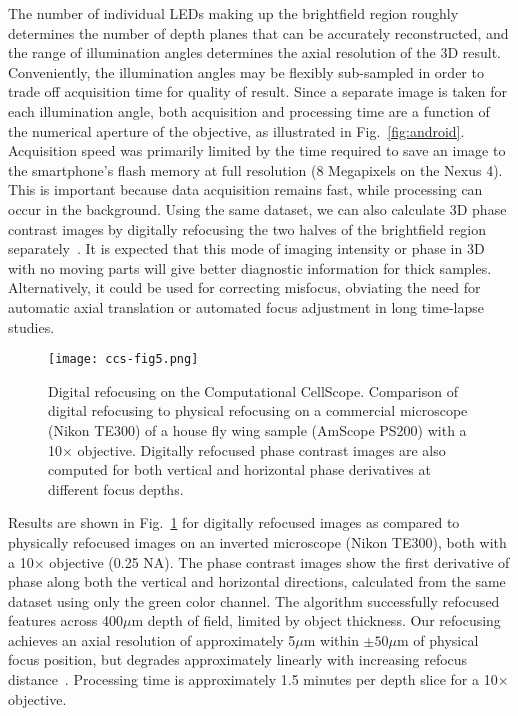 The number of individual LEDs making up the brightfield region roughly determines the number of depth planes that can be accurately reconstructed, and the range of illumination angles determines the axial resolution of the 3D result. Conveniently, the illumination angles may be flexibly sub-sampled in order to trade off acquisition time for quality of result. Since a separate image is taken for each illumination angle, both acquisition and processing time are a function of the numerical aperture of the objective, as illustrated in Fig.~\ref{fig:android}. Acquisition speed was primarily limited by the time required to save an image to the smartphone’s flash memory at full resolution (8 Megapixels on the Nexus 4). This is important because data acquisition remains fast, while processing can occur in the background. Using the same dataset, we can also calculate 3D phase contrast images by digitally refocusing the two halves of the brightfield region separately~\cite{Tian14}. It is expected that this mode of imaging intensity or phase in 3D with no moving parts will give better diagnostic information for thick samples. Alternatively, it could be used for correcting misfocus, obviating the need for automatic axial translation or automated focus adjustment in long time-lapse studies.

\begin{figure}
\begin{center}
\texttt{[image: ccs-fig5.png]}
\end{center}

\caption { {Digital refocusing on the Computational CellScope.} Comparison of digital refocusing to physical refocusing on a commercial microscope (Nikon TE300) of a house fly wing sample (AmScope PS200) with a 10$\times$ objective. Digitally refocused phase contrast images are also computed for both vertical and horizontal phase derivatives at different focus depths.} 

\label{fig:digrefocus}
\end{figure} 

Results are shown in Fig.~\ref{fig:digrefocus} for digitally refocused images as compared to physically refocused images on an inverted microscope (Nikon TE300), both with a 10$\times$ objective (0.25 NA). The phase contrast images show the first derivative of phase along both the vertical and horizontal directions, calculated from the same dataset using only the green color channel. The algorithm successfully refocused features across 400$\mu$m depth of field, limited by object thickness. Our refocusing achieves an axial resolution of approximately 5$\mu$m within $\pm50\mu$m of physical focus position, but degrades approximately linearly with increasing refocus distance~\cite{Tian14}. Processing time is approximately 1.5 minutes per depth slice for a 10$\times$ objective. 

